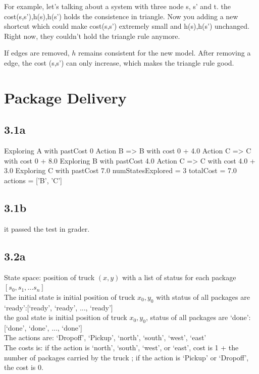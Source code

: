 \documentclass[12pt]{article}
\begin{document}
For example, let's talking about  a system with three node s, s' and t. the cost(s,s'),h(s),h(s') holds the consistence in triangle. Now you adding a new shortcut which could make cost(s,s') extremely small and h(s),h(s') unchanged. Right now, they couldn't hold the triangle rule anymore. 

 
If edges are removed, ${h}$  remains consistent for the new model. After removing a edge, the cost (s,s') can only increase, which makes the triangle rule good. 


\section{Package Delivery}
	\subsection{3.1a}
		

	
	Exploring A with pastCost 0
  Action B => B with cost 0 + 4.0
  Action C => C with cost 0 + 8.0
Exploring B with pastCost 4.0
  Action C => C with cost 4.0 + 3.0
Exploring C with pastCost 7.0
numStatesExplored = 3
totalCost = 7.0
actions = ['B', 'C']
	\subsection{3.1b}
	it passed the test in grader.
	\subsection{3.2a}
			State space: position of truck ${(x, y)}$ with a list of status for each package ${[s_0, s_1, ... s_n]}$\\
		
		The initial state is initial position of truck ${x_0, y_0}$ with status of all packages are `ready':[`ready', `ready', ..., `ready']\\
		
		the goal state is initial position of truck ${x_0, y_0}$, status of all packages are `done': [`done', `done', ..., `done']\\
		
		The actions are: `Dropoff', `Pickup', `north', `south', `west', `east'\\
	
		The costs is: if the action is `north', `south', `west', or `east', cost is 1 + the number of packages carried by the truck ; if the action is `Pickup' or `Dropoff', the cost is 0. \\
		
\end{document}
